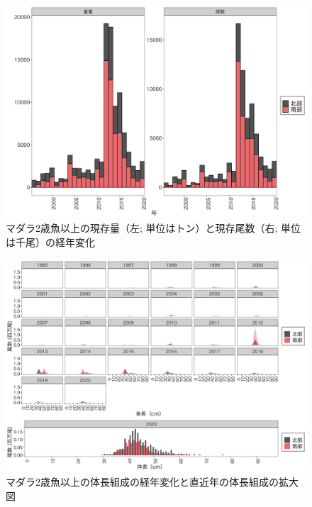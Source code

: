 \documentclass[11pt]{article} %
\begin{document}
\begin{linenumbers}
\begin{figure}[h]
  \centering
  \includegraphics[width = 14cm]{マダラ２＋trend.png}
  \caption{マダラ2歳魚以上の現存量（左; 単位はトン）と現存尾数（右; 単位は千尾）の経年変化}
\end{figure}

\begin{figure}[h]
  \centering
  \includegraphics[width = 14cm]{マダラ2+length.png}
  \caption{マダラ2歳魚以上の体長組成の経年変化と直近年の体長組成の拡大図}
\end{figure}


\end{linenumbers}
\end{document}
